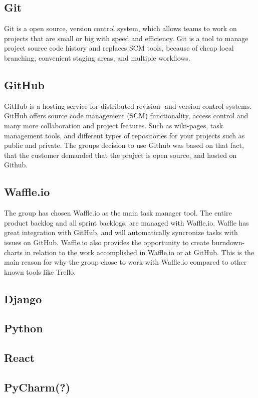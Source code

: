 \subsection{Git}
Git \cite{Git} is a open source, version control system, which allows teams to work on projects that are small or big with speed and efficiency. Git is a tool to manage project source code history and replaces SCM tools, because of cheap local branching, convenient staging areas, and multiple workflows.

\subsection{GitHub}
GitHub\cite{GitHub} is a hosting service for distributed revision- and version control systems. GitHub offers source code management (SCM) functionality, access control and many more collaboration and project features. Such as wiki-pages, task management tools, and different types of repositories for your projects such as public and private. The groups decision to use Github was based on that fact, that the customer demanded that the project is open source, and hosted on Github. 

\subsection{Waffle.io}
The group has chosen Waffle.io \cite{Waffle} as the main task manager tool. The entire product backlog and all sprint backlogs, are managed with Waffle.io. Waffle has great integration with GitHub, and will automatically syncronize tasks with issues on GitHub. Waffle.io also provides the opportunity to create burndown-charts in relation to the work accomplished in Waffle.io or at GitHub. This is the main reason for why the group chose to work with Waffle.io compared to other known tools like Trello. 

\subsection{Django}
\subsection{Python}
\subsection{React}

\subsection{PyCharm(?)}
